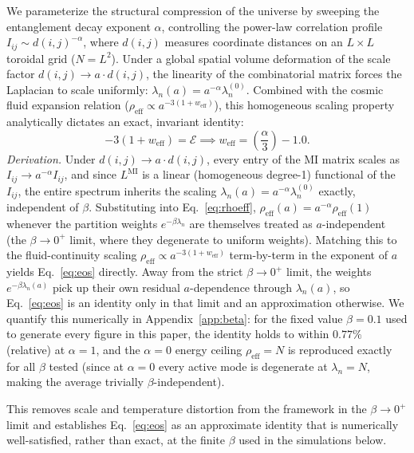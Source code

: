 \documentclass[onecolumn,PRD,amsmath,amssymb,aps,nofootinbib,superscriptaddress,11pt]{revtex4-2}
\begin{document}
We parameterize the structural compression of the universe by sweeping the entanglement decay exponent $\alpha$, controlling the power-law correlation profile $I_{ij} \sim d(i, j)^{-\alpha}$, where $d(i,j)$ measures coordinate distances on an $L \times L$ toroidal grid ($N = L^2$). Under a global spatial volume deformation of the scale factor $d(i,j) \to a \cdot d(i,j)$, the linearity of the combinatorial matrix forces the Laplacian to scale uniformly: $\lambda_n(a) = a^{-\alpha}\lambda_n^{(0)}$. Combined with the cosmic fluid expansion relation ($\rho_{\text{eff}} \propto a^{-3(1+w_{\text{eff}})}$), this homogeneous scaling property analytically dictates an exact, invariant identity:
\begin{equation}
-3(1 + w_{\text{eff}}) = \mathcal{E} \implies w_{\text{eff}} = \left( \frac{\alpha}{3} \right) - 1.0.
\label{eq:eos}
\end{equation}
\emph{Derivation.} Under $d(i,j) \to a\cdot d(i,j)$, every entry of the MI matrix scales as $I_{ij} \to a^{-\alpha} I_{ij}$, and since $L^{\text{MI}}$ is a linear (homogeneous degree-1) functional of the $I_{ij}$, the entire spectrum inherits the scaling $\lambda_n(a) = a^{-\alpha}\lambda_n^{(0)}$ exactly, independent of $\beta$. Substituting into Eq.~\eqref{eq:rhoeff}, $\rho_{\text{eff}}(a) = a^{-\alpha}\rho_{\text{eff}}(1)$ whenever the partition weights $e^{-\beta\lambda_n}$ are themselves treated as $a$-independent (the $\beta\to0^+$ limit, where they degenerate to uniform weights). Matching this to the fluid-continuity scaling $\rho_{\text{eff}} \propto a^{-3(1+w_{\text{eff}})}$ term-by-term in the exponent of $a$ yields Eq.~\eqref{eq:eos} directly. Away from the strict $\beta \to 0^+$ limit, the weights $e^{-\beta\lambda_n(a)}$ pick up their own residual $a$-dependence through $\lambda_n(a)$, so Eq.~\eqref{eq:eos} is an identity only in that limit and an approximation otherwise. We quantify this numerically in Appendix~\ref{app:beta}: for the fixed value $\beta=0.1$ used to generate every figure in this paper, the identity holds to within $0.77\%$ (relative) at $\alpha=1$, and the $\alpha=0$ energy ceiling $\rho_{\text{eff}}=N$ is reproduced exactly for all $\beta$ tested (since at $\alpha=0$ every active mode is degenerate at $\lambda_n=N$, making the average trivially $\beta$-independent).

This removes scale and temperature distortion from the framework in the $\beta \to 0^+$ limit and establishes Eq.~\eqref{eq:eos} as an approximate identity that is numerically well-satisfied, rather than exact, at the finite $\beta$ used in the simulations below.
\end{document}
